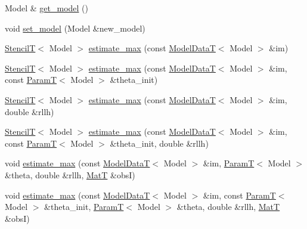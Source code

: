 \begin{DoxyCompactItemize}
\item 
Model \& \hyperlink{classmappel_1_1Estimator_a6c0b757d89033d70bdf03ad1fe6b03da}{get\+\_\+model} ()
\item 
void \hyperlink{classmappel_1_1Estimator_aacade4f66038545ad196edf7e8596187}{set\+\_\+model} (Model \&new\+\_\+model)
\item 
\hyperlink{namespacemappel_a3a06598240007876f8c4bf834ad86197}{StencilT}$<$ Model $>$ \hyperlink{classmappel_1_1Estimator_a4406c994d5b6239e75628ea5d479bfa2}{estimate\+\_\+max} (const \hyperlink{namespacemappel_a97f050df953605381ae9c901c3b125f1}{Model\+DataT}$<$ Model $>$ \&im)
\item 
\hyperlink{namespacemappel_a3a06598240007876f8c4bf834ad86197}{StencilT}$<$ Model $>$ \hyperlink{classmappel_1_1Estimator_aa8aa62047bfc28b1df3a9261da4f38a1}{estimate\+\_\+max} (const \hyperlink{namespacemappel_a97f050df953605381ae9c901c3b125f1}{Model\+DataT}$<$ Model $>$ \&im, const \hyperlink{namespacemappel_a667925cb0d6c0e49f2f035cc5a9a6857}{ParamT}$<$ Model $>$ \&theta\+\_\+init)
\item 
\hyperlink{namespacemappel_a3a06598240007876f8c4bf834ad86197}{StencilT}$<$ Model $>$ \hyperlink{classmappel_1_1Estimator_ab1be1fb34a71f9a46700c9d455fd5daf}{estimate\+\_\+max} (const \hyperlink{namespacemappel_a97f050df953605381ae9c901c3b125f1}{Model\+DataT}$<$ Model $>$ \&im, double \&rllh)
\item 
\hyperlink{namespacemappel_a3a06598240007876f8c4bf834ad86197}{StencilT}$<$ Model $>$ \hyperlink{classmappel_1_1Estimator_a2544f56248cb0f0763c964ddfaad32cc}{estimate\+\_\+max} (const \hyperlink{namespacemappel_a97f050df953605381ae9c901c3b125f1}{Model\+DataT}$<$ Model $>$ \&im, const \hyperlink{namespacemappel_a667925cb0d6c0e49f2f035cc5a9a6857}{ParamT}$<$ Model $>$ \&theta\+\_\+init, double \&rllh)
\item 
void \hyperlink{classmappel_1_1Estimator_a79f2d1c46789fed681985bb670e5ca37}{estimate\+\_\+max} (const \hyperlink{namespacemappel_a97f050df953605381ae9c901c3b125f1}{Model\+DataT}$<$ Model $>$ \&im, \hyperlink{namespacemappel_a667925cb0d6c0e49f2f035cc5a9a6857}{ParamT}$<$ Model $>$ \&theta, double \&rllh, \hyperlink{namespacemappel_a7091ab87c528041f7e2027195fad8915}{MatT} \&obsI)
\item 
void \hyperlink{classmappel_1_1Estimator_a8f85cf26c72c34d0071ccd2f8bb56abd}{estimate\+\_\+max} (const \hyperlink{namespacemappel_a97f050df953605381ae9c901c3b125f1}{Model\+DataT}$<$ Model $>$ \&im, const \hyperlink{namespacemappel_a667925cb0d6c0e49f2f035cc5a9a6857}{ParamT}$<$ Model $>$ \&theta\+\_\+init, \hyperlink{namespacemappel_a667925cb0d6c0e49f2f035cc5a9a6857}{ParamT}$<$ Model $>$ \&theta, double \&rllh, \hyperlink{namespacemappel_a7091ab87c528041f7e2027195fad8915}{MatT} \&obsI)

\end{DoxyCompactItemize}
